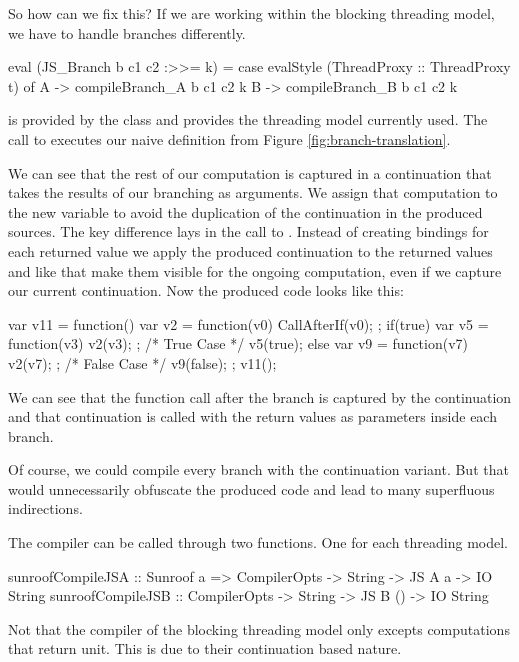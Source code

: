 So how can we fix this? If we are working within the blocking 
threading model, we have to handle branches differently.
\begin{Code}
eval (JS_Branch b c1 c2 :>>= k) = 
  case evalStyle (ThreadProxy :: ThreadProxy t) of
    A -> compileBranch_A b c1 c2 k
    B -> compileBranch_B b c1 c2 k
\end{Code}
 is provided by the class  and
provides the threading model currently used. The call to 
executes our naive definition from Figure \ref{fig:branch-translation}.
We can see that the rest of our computation is captured in a
continuation  that takes the results of our branching
as arguments. We assign that computation to the new variable 
to avoid the duplication of the continuation in the produced sources.
The key difference lays in the call to . Instead
of creating bindings for each returned value we apply the produced
continuation to the returned values and like that make them visible for
the ongoing computation, even if we capture our current continuation. 
Now the produced code looks like this:
\begin{Code}
var v11 = function() {
  var v2 = function(v0) { CallAfterIf(v0); };
  if(true){
    var v5 = function(v3) { v2(v3); };
    /* True Case */
    v5(true);
  } else {
    var v9 = function(v7) { v2(v7); };
    /* False Case */
    v9(false);
  }
};
v11();
\end{Code}
We can see that the function call after the branch is captured by the 
continuation  and that continuation is called with the 
return values as parameters inside each branch.

Of course, we could compile every branch with the 
continuation variant. But that would unnecessarily 
obfuscate the produced code and lead to many superfluous 
indirections.

The compiler can be called through two functions. 
One for each threading model.
\begin{Code}
sunroofCompileJSA :: Sunroof a 
                  => CompilerOpts -> String -> JS A a  -> IO String
sunroofCompileJSB :: CompilerOpts -> String -> JS B () -> IO String
\end{Code}
Not that the compiler of the blocking threading model only
excepts computations that return unit. This is due to their 
continuation based nature.

